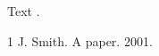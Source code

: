 \documentclass{article}
\begin{document}
Text \citep{a}.
\begin{thebibliography}{1}
 J. Smith. A paper. 2001.
\end{thebibliography}
\end{document}
